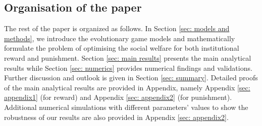 \documentclass{article}
\begin{document}
\subsection*{Organisation of the paper} The rest of the paper is organized as follows. In Section \ref{sec: models and methods}, we introduce the evolutionary game models and mathematically formulate the problem of optimising the social welfare for both institutional reward and punishment. Section \ref{sec: main results} presents the main analytical results while Section \ref{sec: numerics} provides numerical findings and validations. Further discussion and outlook is given in Section \ref{sec: summary}. Detailed proofs of the main analytical  results are provided in Appendix, namely Appendix \ref{sec: appendix1} (for reward) and Appendix \ref{sec: appendix2} (for punishment). Additional numerical simulations with different parameters' values to show the robustness of our results are also provided in Appendix \ref{sec: appendix2}.



\end{document}
